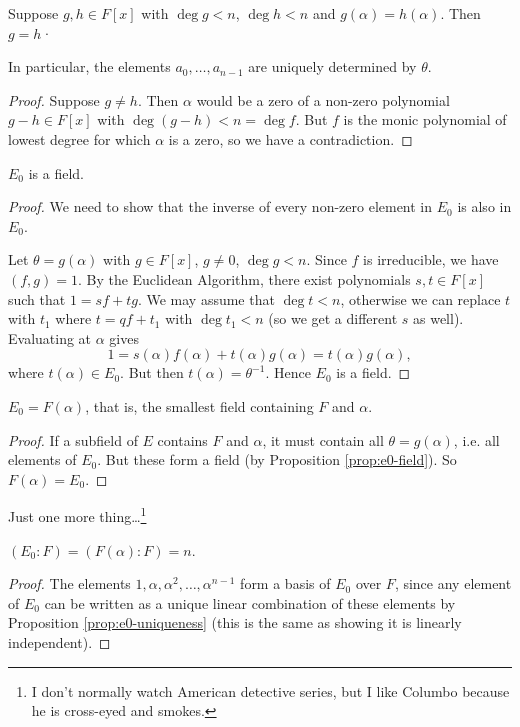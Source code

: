 \begin{proposition}\label{prop:e0-uniqueness}
	Suppose $g, h \in F[x]$ with $\deg{g} < n$, $\deg{h} < n$ and $g(\alpha) = h(\alpha)$. Then $g = h$·
	
	In particular, the elements $a_0, \dots, a_{n - 1}$ are uniquely determined by $\theta$.
	\begin{proof}
		Suppose $g \neq h$. Then $\alpha$ would be a zero of a non-zero polynomial $g - h \in F[x]$ with $\deg{(g - h)} < n = \deg{f}$. But $f$ is the monic polynomial of lowest degree for which $\alpha$ is a zero, so we have a contradiction.
	\end{proof}
\end{proposition}

\begin{proposition} \label{prop:e0-field}
	$E_0$ is a field.
	\begin{proof}
		We need to show that the inverse of every non-zero element in $E_0$ is also in $E_0$.
		
		Let $\theta = g(\alpha)$ with $g \in F[x]$, $g \neq 0$, $\deg{g} < n$. Since $f$ is irreducible, we have $(f, g) = 1$. By the Euclidean Algorithm, there exist polynomials $s, t \in F[x]$ such that $1 = sf + tg$. We may assume that $\deg{t} < n$, otherwise we can replace $t$ with $t_1$ where $t = qf + t_1$ with $\deg{t_1} < n$ (so we get a different $s$ as well). Evaluating at $\alpha$ gives
		\[
			1 = s(\alpha)f(\alpha) + t(\alpha)g(\alpha) = t(\alpha)g(\alpha),
		\]
		where $t(\alpha) \in E_0$. But then $t(\alpha) = \theta^{-1}$. Hence $E_0$ is a field.
	\end{proof}
\end{proposition}

\begin{proposition}
	$E_0 = F(\alpha)$, that is, the smallest field containing $F$ and $\alpha$.
	\begin{proof}
		If a subfield of $E$ contains $F$ and $\alpha$, it must contain all $\theta = g(\alpha)$, i.e. all elements of $E_0$. But these form a field (by Proposition \ref{prop:e0-field}). So $F(\alpha) = E_0$.
	\end{proof}
\end{proposition}

Just one more thing\dots\footnote{I don't normally watch American detective series, but I like Columbo because he is cross-eyed and smokes.}
\begin{proposition}
	$(E_0 : F) = (F(\alpha) : F) = n$.
	\begin{proof}
		The elements $1, \alpha, \alpha^2, \dots, \alpha^{n - 1}$ form a basis of $E_0$ over $F$, since any element of $E_0$ can be written as a unique linear combination of these elements by Proposition \ref{prop:e0-uniqueness} (this is the same as showing it is linearly independent).
	\end{proof}
\end{proposition}

